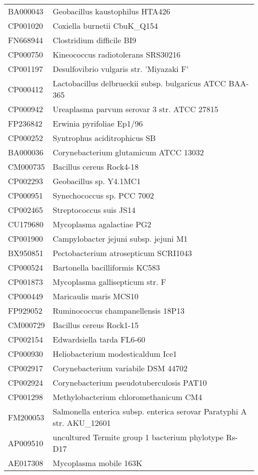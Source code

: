 \begin{longtable}{ll}
BA000043 & Geobacillus kaustophilus HTA426\\
CP001020 & Coxiella burnetii CbuK_Q154\\
FN668944 & Clostridium difficile BI9\\
CP000750 & Kineococcus radiotolerans SRS30216\\
CP001197 & Desulfovibrio vulgaris str. 'Miyazaki F'\\
CP000412 & Lactobacillus delbrueckii subsp. bulgaricus ATCC BAA-365\\
CP000942 & Ureaplasma parvum serovar 3 str. ATCC 27815\\
FP236842 & Erwinia pyrifoliae Ep1/96\\
CP000252 & Syntrophus aciditrophicus SB\\
BA000036 & Corynebacterium glutamicum ATCC 13032\\
CM000735 & Bacillus cereus Rock4-18\\
CP002293 & Geobacillus sp. Y4.1MC1\\
CP000951 & Synechococcus sp. PCC 7002\\
CP002465 & Streptococcus suis JS14\\
CU179680 & Mycoplasma agalactiae PG2\\
CP001900 & Campylobacter jejuni subsp. jejuni M1\\
BX950851 & Pectobacterium atrosepticum SCRI1043\\
CP000524 & Bartonella bacilliformis KC583\\
CP001873 & Mycoplasma gallisepticum str. F\\
CP000449 & Maricaulis maris MCS10\\
FP929052 & Ruminococcus champanellensis 18P13\\
CM000729 & Bacillus cereus Rock1-15\\
CP002154 & Edwardsiella tarda FL6-60\\
CP000930 & Heliobacterium modesticaldum Ice1\\
CP002917 & Corynebacterium variabile DSM 44702\\
CP002924 & Corynebacterium pseudotuberculosis PAT10\\
CP001298 & Methylobacterium chloromethanicum CM4\\
FM200053 & Salmonella enterica subsp. enterica serovar Paratyphi A str. AKU_12601\\
AP009510 & uncultured Termite group 1 bacterium phylotype Rs-D17\\
AE017308 & Mycoplasma mobile 163K\\

\end{longtable}
